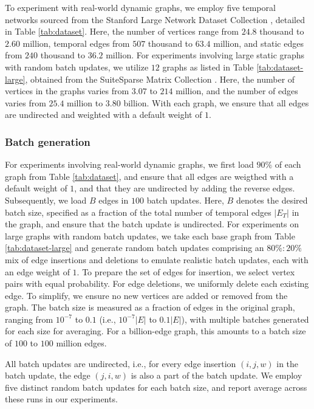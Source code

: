 To experiment with real-world dynamic graphs, we employ five temporal networks sourced from the Stanford Large Network Dataset Collection \cite{snapnets}, detailed in Table \ref{tab:dataset}. Here, the number of vertices range from $24.8$ thousand to $2.60$ million, temporal edges from $507$ thousand to $63.4$ million, and static edges from $240$ thousand to $36.2$ million. For experiments involving large static graphs with random batch updates, we utilize $12$ graphs as listed in Table \ref{tab:dataset-large}, obtained from the SuiteSparse Matrix Collection \cite{suite19}. Here, the number of vertices in the graphs varies from $3.07$ to $214$ million, and the number of edges varies from $25.4$ million to $3.80$ billion. With each graph, we ensure that all edges are undirected and weighted with a default weight of $1$.





\subsubsection{Batch generation}
\label{sec:batch-generation}

For experiments involving real-world dynamic graphs, we first load $90\%$ of each graph from Table \ref{tab:dataset}, and ensure that all edges are weigthed with a default weight of $1$, and that they are undirected by adding the reverse edges. Subsequently, we load $B$ edges in $100$ batch updates. Here, $B$ denotes the desired batch size, specified as a fraction of the total number of temporal edges $|E_T|$ in the graph, and ensure that the batch update is undirected. For experiments on large graphs with random batch updates, we take each base graph from Table \ref{tab:dataset-large} and generate random batch updates \cite{com-zarayeneh21} comprising an $80\% : 20\%$ mix of edge insertions and deletions to emulate realistic batch updates, each with an edge weight of $1$. To prepare the set of edges for insertion, we select vertex pairs with equal probability. For edge deletions, we uniformly delete each existing edge. To simplify, we ensure no new vertices are added or removed from the graph. The batch size is measured as a fraction of edges in the original graph, ranging from $10^{-7}$ to $0.1$ (i.e., $10^{-7}|E|$ to $0.1|E|$), with multiple batches generated for each size for averaging. For a billion-edge graph, this amounts to a batch size of $100$ to $100$ million edges. All batch updates are undirected, i.e., for every edge insertion $(i, j, w)$ in the batch update, the edge $(j, i, w)$ is also a part of the batch update. We employ five distinct random batch updates for each batch size, and report average across these runs in our experiments.


